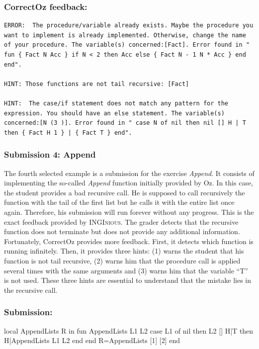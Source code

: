 \documentclass[11pt,a4paper,twoside,openright]{report}
\begin{document}
\subsubsection*{CorrectOz feedback:}
 \begin{lstlisting}
ERROR:  The procedure/variable already exists. Maybe the procedure you want to implement is already implemented. Otherwise, change the name of your procedure. The variable(s) concerned:[Fact]. Error found in " fun { Fact N Acc } if N < 2 then Acc else { Fact N - 1 N * Acc } end end".

HINT: Those functions are not tail recursive: [Fact]

HINT:  The case/if statement does not match any pattern for the expression. You should have an else statement. The variable(s) concerned:[N (3 )]. Error found in " case N of nil then nil [] H | T then { Fact H 1 } | { Fact T } end".
 \end{lstlisting}

\subsubsection{Submission 4: Append}
The fourth selected example is a submission for the exercise \textit{Append}. 
It consists of implementing the so-called \textit{Append} function 
initially provided by Oz. In this case, the student provides a bad recursive 
call. He is supposed to call recursively the function with the tail of the 
first list but he calls it with the entire list once again. Therefore, his 
submission will run forever without any progress. This is the exact feedback 
provided by \textsc{INGInious}. The grader detects that the recursive function 
does not terminate but does not provide any additional information. 
Fortunately, CorrectOz provides more feedback. First, it detects which 
function is running infinitely. Then, it provides three hints: (1) warns the 
student that his function is not tail recursive, (2) warns him that the 
procedure call is applied several times with the same arguments and (3) warns 
him that the variable \enquote{T} is not used. These three hints are essential 
to understand that the mistake lies in the recursive call.

\subsubsection*{Submission:}
 \begin{OZ}
    local AppendLists R in
      fun {AppendLists L1 L2}
        case L1 of nil then L2
        [] H|T then H|{AppendLists L1 L2}
        end
      end
      R={AppendLists [1] [2]}
    end
 \end{OZ}
 
\end{document}
